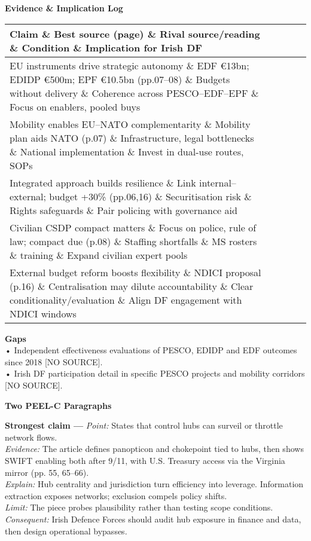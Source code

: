 \textbf{Evidence \& Implication Log}
\begin{tabular}{p{3.2cm}p{4.2cm}p{3.6cm}p{3.2cm}p{4.2cm}}
	\textbf{Claim} \& \textbf{Best source (page)} \& \textbf{Rival source/reading} \& \textbf{Condition} \& \textbf{Implication for Irish DF}\\\hline
	EU instruments drive strategic autonomy \& EDF €13bn; EDIDP €500m; EPF €10.5bn (pp.07–08) \& Budgets without delivery \& Coherence across PESCO–EDF–EPF \& Focus on enablers, pooled buys\\
	Mobility enables EU–NATO complementarity \& Mobility plan aids NATO (p.07) \& Infrastructure, legal bottlenecks \& National implementation \& Invest in dual-use routes, SOPs\\
	Integrated approach builds resilience \& Link internal–external; budget +30\% (pp.06,16) \& Securitisation risk \& Rights safeguards \& Pair policing with governance aid\\
	Civilian CSDP compact matters \& Focus on police, rule of law; compact due (p.08) \& Staffing shortfalls \& MS rosters \& training \& Expand civilian expert pools\\
	External budget reform boosts flexibility \& NDICI proposal (p.16) \& Centralisation may dilute accountability \& Clear conditionality/evaluation \& Align DF engagement with NDICI windows\\
\end{tabular}

\textbf{Gaps}\\
• Independent effectiveness evaluations of PESCO, EDIDP and EDF outcomes since 2018 [NO SOURCE].\\
• Irish DF participation detail in specific PESCO projects and mobility corridors [NO SOURCE].

\textbf{Two PEEL-C Paragraphs}

\textbf{Strongest claim —} \textit{Point:} States that control hubs can surveil or throttle network flows.\\
\textit{Evidence:} The article defines panopticon and chokepoint tied to hubs, then shows SWIFT enabling both after 9/11, with U.S. Treasury access via the Virginia mirror (pp. 55, 65–66).\\
\textit{Explain:} Hub centrality and jurisdiction turn efficiency into leverage. Information extraction exposes networks; exclusion compels policy shifts.\\
\textit{Limit:} The piece probes plausibility rather than testing scope conditions.\\
\textit{Consequent:} Irish Defence Forces should audit hub exposure in finance and data, then design operational bypasses.


